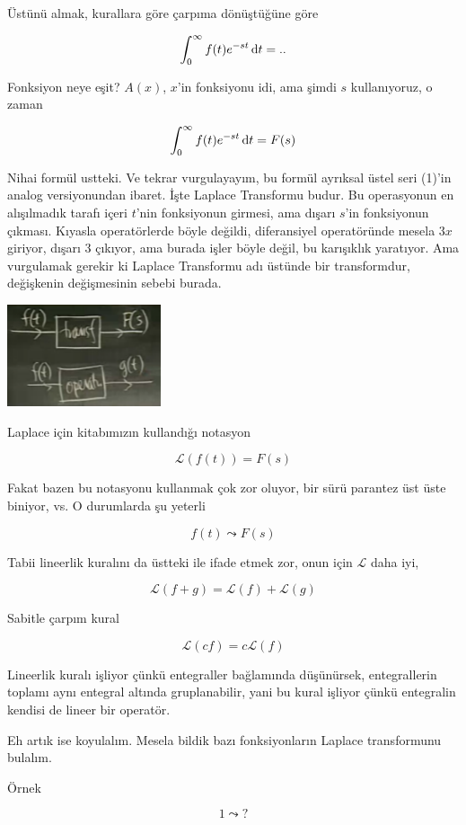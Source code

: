 \documentclass[12pt,fleqn]{article}\usepackage{../../common}
\begin{document}
Üstünü almak, kurallara göre çarpıma dönüştüğüne göre

$$ \int_0^{\infty} f(t)e^{-st} \,\mathrm{d} t = ..$$

Fonksiyon neye eşit? $A(x)$, $x$'in fonksiyonu idi, ama şimdi $s$
kullanıyoruz, o zaman 

$$ \int_0^{\infty} f(t)e^{-st} \,\mathrm{d} t = F(s)$$

Nihai formül ustteki. Ve tekrar vurgulayayım, bu formül ayrıksal üstel seri
(1)'in analog versiyonundan ibaret. İşte Laplace Transformu budur. Bu
operasyonun en alışılmadık tarafı içeri $t$'nin fonksiyonun girmesi, ama
dışarı $s$'in fonksiyonun çıkması. Kıyasla operatörlerde böyle değildi,
diferansiyel operatöründe mesela $3x$ giriyor, dışarı $3$ çıkıyor, ama
burada işler böyle değil, bu karışıklık yaratıyor. Ama vurgulamak gerekir
ki Laplace Transformu adı üstünde bir transformdur, değişkenin değişmesinin
sebebi burada. 

\includegraphics[height=3cm]{19_1.png}

Laplace için kitabımızın kullandığı notasyon 

$$ \mathcal{L}(f(t)) = F(s) $$

Fakat bazen bu notasyonu kullanmak çok zor oluyor, bir sürü parantez üst
üste biniyor, vs. O durumlarda şu yeterli

$$ f(t) \leadsto F(s) $$

Tabii lineerlik kuralını da üstteki ile ifade etmek zor, onun için
$\mathcal{L}$ daha iyi, 

$$ \mathcal{L}(f+g) = \mathcal{L}(f) + \mathcal{L}(g) $$

Sabitle çarpım kural 

$$ \mathcal{L}(cf) = c \mathcal{L}(f)  $$

Lineerlik kuralı işliyor çünkü entegraller bağlamında düşünürsek,
entegrallerin toplamı aynı entegral altında gruplanabilir, yani bu kural
işliyor çünkü entegralin kendisi de lineer bir operatör. 

Eh artık ise koyulalım. Mesela bildik bazı fonksiyonların Laplace
transformunu bulalım. 

Örnek

$$ 1 \leadsto ? $$
\end{document}
